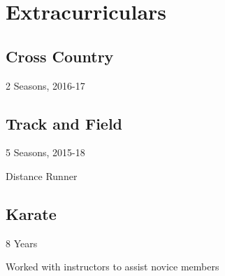 \documentclass[12pt,letterpaper]{deedy-resume} %
\begin{document}
\begin{minipage}[t]{0.5\textwidth}
\sectionspace

\section{Extracurriculars}

\subsection{Cross Country}
\begin{tightitemize}
\sectionspace %
\sectionspace
\item 2 Seasons, 2016-17
\end{tightitemize}

\sectionspace
\subsection{Track and Field}
\begin{tightitemize}
\sectionspace
\sectionspace
\item 5 Seasons, 2015-18
\item Distance Runner
\end{tightitemize}

\sectionspace
\subsection{Karate}
\begin{tightitemize}
\sectionspace
\sectionspace
\item 8 Years
\item Worked with instructors to assist novice members
\end{tightitemize}

\end{minipage} %
\end{document}
